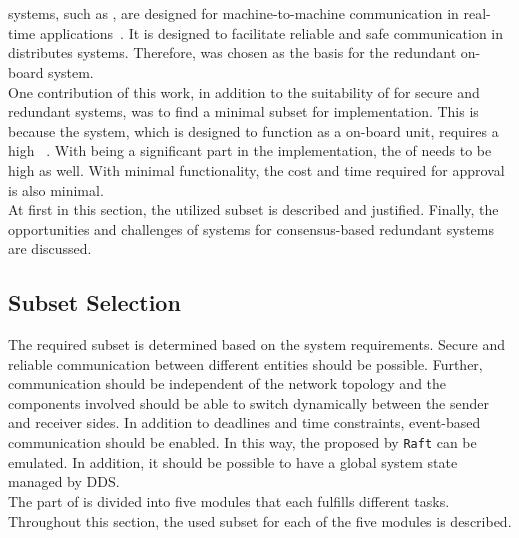 \section{}

 systems, such as , are designed for machine-to-machine communication in real-time applications~\cite{omgDDSspec}.
It is designed to facilitate reliable and safe communication in distributes systems.
Therefore,  was chosen as the basis for the redundant on-board system.
\\

One contribution of this work, in addition to the suitability of  for secure and redundant systems, was to find a minimal subset for implementation.
This is because the system, which is designed to function as a  on-board unit, requires a high ~\cite{ChakrabortyFaultTolerantRailway}.
With  being a significant part in the implementation, the  of  needs to be high as well.
With minimal functionality, the cost and time required for approval is also minimal.
\\

At first in this section, the utilized  subset is described and justified.
Finally, the opportunities and challenges of  systems for consensus-based redundant systems are discussed.

\subsection{Subset Selection}

The required subset is determined based on the system requirements.
Secure and reliable communication between different entities should be possible.
Further, communication should be independent of the network topology and the components involved should be able to switch dynamically between the sender and receiver sides.
In addition to deadlines and time constraints, event-based communication should be enabled.
In this way, the  proposed by \texttt{Raft} can be emulated.
In addition, it should be possible to have a global system state managed by DDS.
\\

The  part of  is divided into five modules that each fulfills different tasks.
Throughout this section, the used subset for each of the five modules is described.
\\

